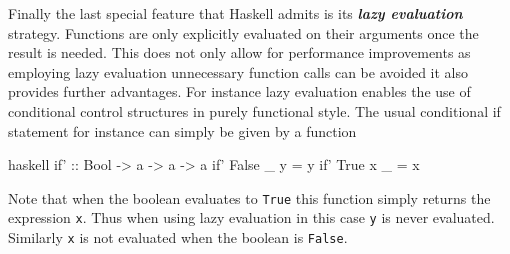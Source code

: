 \documentclass[a4paper,12pt, DIV=14, BCOR=5mm, twoside, headsepline]{scrbook}
\begin{document}
Finally the last special feature that Haskell admits is its \textit{\textbf{lazy evaluation}} strategy. Functions are only explicitly evaluated on their arguments once the result is needed. This does not only allow for performance improvements as employing lazy evaluation unnecessary function calls can be avoided it also provides further advantages. For instance lazy evaluation enables the use of conditional control structures in purely functional style. The usual conditional if statement for instance can simply be given by a function
\begin{center}
\begin{cminted}{haskell}
if' :: Bool -> a -> a -> a
if' False _ y = y 
if' True x _ = x 
\end{cminted}
\end{center}
Note that when the boolean evaluates to \texttt{True} this function simply returns the expression \texttt{x}. Thus when using lazy evaluation in this case \texttt{y} is never evaluated. Similarly \texttt{x} is not evaluated when the boolean is \texttt{False}. 
\end{document}
